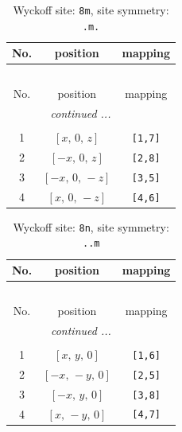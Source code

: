 \documentclass[fleqn,8pt]{jsarticle}
\begin{document}
\renewcommand{\arraystretch}{1.2}
\begin{longtable}{ccc}
\caption{Wyckoff site: {\tt 8m}, site symmetry: {\tt .m.}}
 \\
 \hline \hline
No. & position & mapping \\ \hline \endfirsthead

\multicolumn{2}{l}{\tablename\ \thetable{}} \\
 \hline \hline
No. & position & mapping \\ \hline \endhead

 \hline \hline
\multicolumn{2}{r}{\footnotesize\it continued ...} \\ \endfoot

 \hline \hline
\multicolumn{2}{r}{} \\ \endlastfoot

1 & $\left[ x,\, 0,\, z \right]$ & {\tt [1,7]} \\ \hline
2 & $\left[ - x,\, 0,\, z \right]$ & {\tt [2,8]} \\ \hline
3 & $\left[ - x,\, 0,\, - z \right]$ & {\tt [3,5]} \\ \hline
4 & $\left[ x,\, 0,\, - z \right]$ & {\tt [4,6]} \\
\end{longtable}
\renewcommand{\arraystretch}{1.2}
\begin{longtable}{ccc}
\caption{Wyckoff site: {\tt 8n}, site symmetry: {\tt ..m}}
 \\
 \hline \hline
No. & position & mapping \\ \hline \endfirsthead

\multicolumn{2}{l}{\tablename\ \thetable{}} \\
 \hline \hline
No. & position & mapping \\ \hline \endhead

 \hline \hline
\multicolumn{2}{r}{\footnotesize\it continued ...} \\ \endfoot

 \hline \hline
\multicolumn{2}{r}{} \\ \endlastfoot

1 & $\left[ x,\, y,\, 0 \right]$ & {\tt [1,6]} \\ \hline
2 & $\left[ - x,\, - y,\, 0 \right]$ & {\tt [2,5]} \\ \hline
3 & $\left[ - x,\, y,\, 0 \right]$ & {\tt [3,8]} \\ \hline
4 & $\left[ x,\, - y,\, 0 \right]$ & {\tt [4,7]} \\
\end{longtable}
\end{document}
